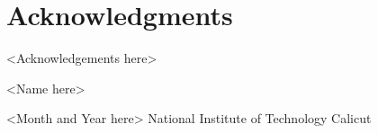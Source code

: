 \cleardoublepage
{}
{}
\chapter*{Acknowledgments}
\vspace{1.0in}
<Acknowledgements here>


 

<Name here>

<Month and Year here>
{National Institute of Technology Calicut}
\newpage
